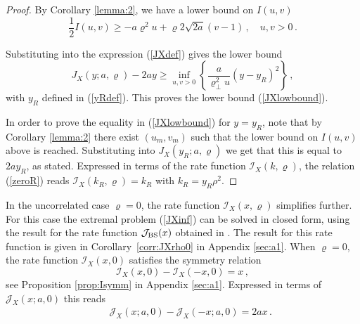 \documentclass[11pt]{article}
\numberwithin{equation}{section}
\theoremstyle{plain}
\begin{document}
\begin{proof}
By Corollary \ref{lemma:2}, we have a lower bound on $I(u,v)$ 
\begin{equation}
\frac12 I(u,v) \geq - a \varrho^2 u + \varrho 2\sqrt{2a} (v-1)\,,\quad u,v > 0\,.
\end{equation}

Substituting into the expression (\ref{JXdef}) gives the lower bound
\begin{equation}
J_X(y;a,\varrho) - 2 a y \geq \inf_{u,v>0} \left\{ \frac{a}{\varrho_\perp^2 u} (y - y_R)^2 \right\}\,,
\end{equation}
with $y_R$ defined in (\ref{yRdef}). This proves the lower bound (\ref{JXlowbound}).

In order to prove the equality in (\ref{JXlowbound})
for $y=y_R$, note that by Corollary \ref{lemma:2} there exist $(u_m,v_m)$ such that
the lower bound on $I(u,v)$ above is reached. Substituting into $J_X(y_R;a,\varrho)$
we get that this is equal to $2ay_R$, as stated. Expressed in terms of the
rate function $\mathcal{I}_X(k,\varrho)$, the relation (\ref{zeroR}) reads
$\mathcal{I}_X(k_R,\varrho) = k_R$ with $k_R = y_R \rho^2$.
\end{proof}




In the uncorrelated case $\varrho=0$, the rate function 
$\mathcal{I}_X(x,\varrho)$ simplifies further. 
For this case the extremal problem (\ref{JXinf}) can be solved in closed form,
using the result for 
the rate function $\mathcal{J}_{\rm BS}(x)$ obtained in \cite{PZSIFIN}. 
The result for this rate function is given in Corollary~\ref{corr:JXrho0}
in Appendix \ref{sec:a1}.
When $\varrho=0$, the rate function $\mathcal{I}_X(x,0)$ 
satisfies the symmetry relation
\begin{equation}\label{Isymm}
\mathcal{I}_X(x,0) - \mathcal{I}_X(-x,0) = x\,,
\end{equation}
see Proposition \ref{prop:Isymm}
in Appendix \ref{sec:a1}. Expressed in terms of $\mathcal{J}_X(x ; a, 0)$
this reads
\begin{eqnarray}
\label{JXsymm2}
&& \mathcal{J}_X(x ; a, 0) - \mathcal{J}_X(-x ; a, 0) = 2ax\,.
\end{eqnarray}
\end{document}
